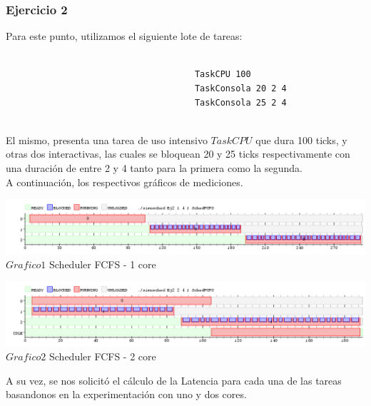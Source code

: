 \subsubsection[Resolución Ejercicio 2]{Ejercicio 2}

\indent Para este punto, utilizamos el siguiente lote de tareas:
\begin{verbatim}
 
                                     TaskCPU 100
                                     TaskConsola 20 2 4
                                     TaskConsola 25 2 4


\end{verbatim}

\indent El mismo, presenta una tarea de uso intensivo $TaskCPU$ que dura 100 ticks, y otras dos interactivas, las cuales se
bloquean 20 y 25 ticks respectivamente con una duración de entre 2 y 4 tanto para la primera como la segunda.\\
A continuación, los respectivos gráficos de mediciones.


\vspace*{0.3cm} \vspace*{0.3cm}
  \begin{center}
 \includegraphics[scale=0.5]{./Test/ej2_1.png}
 { $Grafico 1$ Scheduler FCFS - 1 core }
 \end{center}
  \vspace*{0.3cm}
 
  
\vspace*{0.3cm} \vspace*{0.3cm}
  \begin{center}
 \includegraphics[scale=0.5]{./Test/ej2_2.png}
 { $Grafico 2$ Scheduler FCFS - 2 core }
 \end{center}
  \vspace*{0.3cm}

A su vez, se nos solicit\'{o} el c\'{a}lculo de la Latencia para cada una de las tareas basandonos en la 
experimentaci\'{o}n con uno y dos cores.\\


